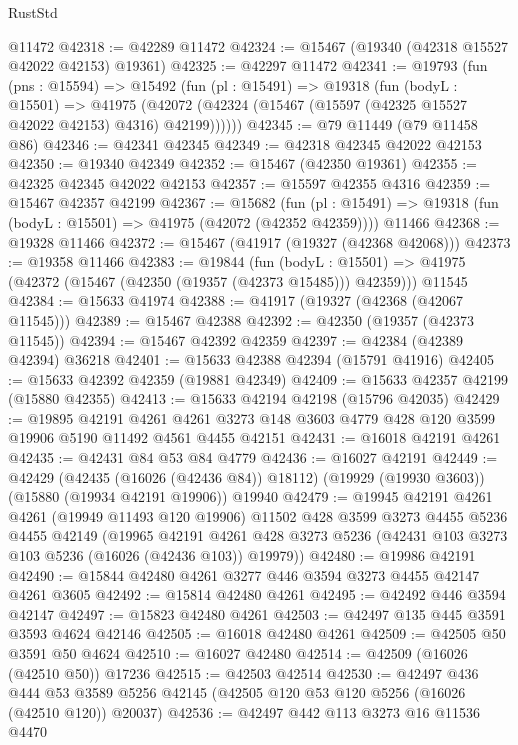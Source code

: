 \begin{lexlean}{RustStd}
\begin{coremodule}
    @11472
@42318 := @42289 @11472
@42324 := @15467 (@19340 (@42318 @15527 @42022 @42153) @19361)
@42325 := @42297 @11472
@42341 := @19793
    (fun (pns : @15594) =>
    @15492
      (fun (pl : @15491) =>
      @19318
        (fun (bodyL : @15501) =>
        @41975 (@42072 (@42324 (@15467 (@15597 (@42325 @15527 @42022 @42153) @4316) @42199))))))
@42345 := @79 @11449 (@79 @11458 @86)
@42346 := @42341 @42345
@42349 := @42318 @42345 @42022 @42153
@42350 := @19340 @42349
@42352 := @15467 (@42350 @19361)
@42355 := @42325 @42345 @42022 @42153
@42357 := @15597 @42355 @4316
@42359 := @15467 @42357 @42199
@42367 := @15682
    (fun (pl : @15491) => @19318 (fun (bodyL : @15501) => @41975 (@42072 (@42352 @42359))))
    @11466
@42368 := @19328 @11466
@42372 := @15467 (@41917 (@19327 (@42368 @42068)))
@42373 := @19358 @11466
@42383 := @19844
    (fun (bodyL : @15501) => @41975 (@42372 (@15467 (@42350 (@19357 (@42373 @15485))) @42359)))
    @11545
@42384 := @15633 @41974
@42388 := @41917 (@19327 (@42368 (@42067 @11545)))
@42389 := @15467 @42388
@42392 := @42350 (@19357 (@42373 @11545))
@42394 := @15467 @42392 @42359
@42397 := @42384 (@42389 @42394) @36218
@42401 := @15633 @42388 @42394 (@15791 @41916)
@42405 := @15633 @42392 @42359 (@19881 @42349)
@42409 := @15633 @42357 @42199 (@15880 @42355)
@42413 := @15633 @42194 @42198 (@15796 @42035)
@42429 := @19895
    @42191
    @4261
    @4261
    @3273
    @148
    @3603
    @4779
    @428
    @120
    @3599
    @19906
    @5190
    @11492
    @4561
    @4455
    @42151
@42431 := @16018 @42191 @4261
@42435 := @42431 @84 @53 @84 @4779
@42436 := @16027 @42191
@42449 := @42429
    (@42435 (@16026 (@42436 @84)) @18112)
    (@19929 (@19930 @3603))
    (@15880 (@19934 @42191 @19906))
    @19940
@42479 := @19945
    @42191
    @4261
    @4261
    (@19949 @11493 @120 @19906)
    @11502
    @428
    @3599
    @3273
    @4455
    @5236
    @4455
    @42149
    (@19965
      @42191
      @4261
      @428
      @3273
      @5236
      (@42431 @103 @3273 @103 @5236 (@16026 (@42436 @103)) @19979))
@42480 := @19986 @42191
@42490 := @15844 @42480 @4261 @3277 @446 @3594 @3273 @4455 @42147 @4261 @3605
@42492 := @15814 @42480 @4261
@42495 := @42492 @446 @3594 @42147
@42497 := @15823 @42480 @4261
@42503 := @42497 @135 @445 @3591 @3593 @4624 @42146
@42505 := @16018 @42480 @4261
@42509 := @42505 @50 @3591 @50 @4624
@42510 := @16027 @42480
@42514 := @42509 (@16026 (@42510 @50)) @17236
@42515 := @42503 @42514
@42530 := @42497
    @436
    @444
    @53
    @3589
    @5256
    @42145
    (@42505 @120 @53 @120 @5256 (@16026 (@42510 @120)) @20037)
@42536 := @42497 @442 @113 @3273 @16 @11536 @4470

\end{coremodule}
\end{lexlean}
